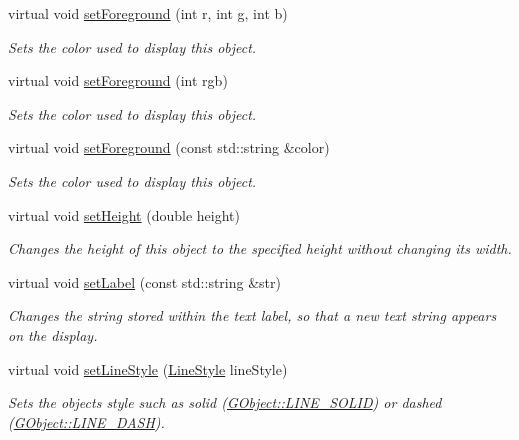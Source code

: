 \begin{DoxyCompactItemize}
virtual void \mbox{\hyperlink{classGObject_ad18e8fab1e02a4e9b75c6730212558eb}{set\+Foreground}} (int r, int g, int b)
\begin{DoxyCompactList}\small\item\em Sets the color used to display this object. \end{DoxyCompactList}\item 
virtual void \mbox{\hyperlink{classGObject_a9eb856b5ff83a19df3831a31f15f4563}{set\+Foreground}} (int rgb)
\begin{DoxyCompactList}\small\item\em Sets the color used to display this object. \end{DoxyCompactList}\item 
virtual void \mbox{\hyperlink{classGObject_af59209aeadea6dfc6d97a2d8531f50e1}{set\+Foreground}} (const std\+::string \&color)
\begin{DoxyCompactList}\small\item\em Sets the color used to display this object. \end{DoxyCompactList}\item 
virtual void \mbox{\hyperlink{classGObject_a9e280bfc4544dfaf8e4376c4e1a74357}{set\+Height}} (double height)
\begin{DoxyCompactList}\small\item\em Changes the height of this object to the specified height without changing its width. \end{DoxyCompactList}\item 
virtual void \mbox{\hyperlink{classGText_a889d82f199797fea605ee8230dcd4f6f}{set\+Label}} (const std\+::string \&str)
\begin{DoxyCompactList}\small\item\em Changes the string stored within the text label, so that a new text string appears on the display. \end{DoxyCompactList}\item 
virtual void \mbox{\hyperlink{classGObject_add11575087eb94f1a71faa3f826c6341}{set\+Line\+Style}} (\mbox{\hyperlink{classGObject_a86e0f5648542856159bb40775c854aa7}{Line\+Style}} line\+Style)
\begin{DoxyCompactList}\small\item\em Sets the object\textquotesingle{}s style such as solid (\mbox{\hyperlink{classGObject_a86e0f5648542856159bb40775c854aa7a700c78bc2cd76acaab26651bf7b4941f}{G\+Object\+::\+L\+I\+N\+E\+\_\+\+S\+O\+L\+ID}}) or dashed (\mbox{\hyperlink{classGObject_a86e0f5648542856159bb40775c854aa7a9ccba0845f785d81d07b333ae1aad84e}{G\+Object\+::\+L\+I\+N\+E\+\_\+\+D\+A\+SH}}). \end{DoxyCompactList}\item 

\end{DoxyCompactItemize}
